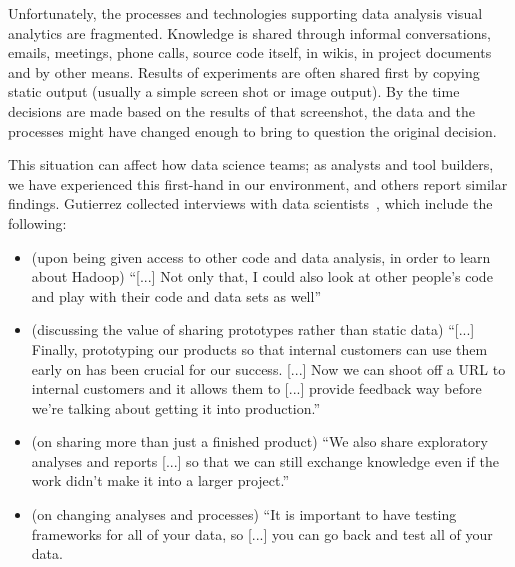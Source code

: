 Unfortunately, the processes and technologies supporting data analysis visual analytics are fragmented.
Knowledge is shared through informal conversations, emails,
meetings, phone calls, source code itself, in wikis, in project documents and
by other means. Results of experiments are often shared first by copying static
output (usually a simple screen shot or image output). By the time
decisions are made based on the results of that screenshot, the data
and the processes might have changed enough to bring to question the
original decision.


This situation can affect how data science teams; as analysts and
tool builders, we have experienced this first-hand in our environment, and
others report similar findings. Gutierrez collected interviews with data
scientists~\cite{Gutierrez:2014:DSA}, which include the following:

\begin{itemize}
\item (upon being given access to other code and data analysis, in
order to learn about Hadoop) ``[...] Not only that, I could also look at other people’s code and
play with their code and data sets as well''
\item (discussing the value of sharing prototypes rather than static
data) ``[...] Finally, prototyping our products so that internal
customers can use them early on has been crucial for
our success. [...] Now we can shoot off a URL to internal
customers and it allows them to [...] provide feedback way before
we're talking about getting it into production.''
\item (on sharing more than just a finished product) ``We also share
exploratory analyses and reports [...] so that we can still exchange
knowledge even if the work didn't make it into a larger project.''
\item (on changing analyses and processes) ``It is important to
have testing frameworks for all of your data, so [...] you can go back and test all
of your data. 
\end{itemize}

